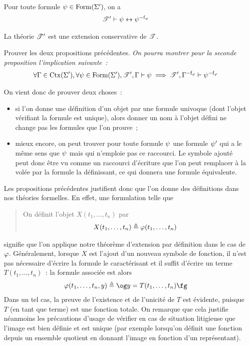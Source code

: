\begin{proposition}
  Pour toute formule $\psi \in \operatorname{Form}(\Sigma')$, on a
  \[\mathscr T' \vdash \psi \mathrel{\leftrightarrow} {\psi}^{-\mathrm{f}_{\varphi}}\]
\end{proposition}

\begin{proposition}\label{prop.ext.def.cons}
  La théorie $\mathscr T'$ est une extension conservative de $\mathscr T$.
\end{proposition}

\begin{exercise}
  Prouver les deux propositions précédentes.
  \textit{On pourra montrer pour la seconde proposition l'implication
    suivante~:}
  \[\forall \Gamma\in\operatorname{Ctx}(\Sigma'), \forall \psi \in \operatorname{Form}(\Sigma'),
  \mathscr T', \Gamma\vdash \psi \implies \mathscr T',{\Gamma}^{-\mathrm{f}_{\varphi}}\vdash {\psi}^{-\mathrm{f}_{\varphi}}\]
\end{exercise}

On vient donc de prouver deux choses~:
\begin{itemize}
\item si l'on donne une définition d'un objet par une formule univoque (dont
  l'objet vérifiant la formule est unique), alors donner un nom à l'objet
  défini ne change pas les formules que l'on prouve~;
\item mieux encore, on peut trouver pour toute formule $\psi$ une formule
  $\psi'$ qui a le même sens que $\psi$ mais qui n'emploie pas ce raccourci.
  Le symbole ajouté peut donc être vu comme un raccourci d'écriture que l'on
  peut remplacer à la volée par la formule la définissant, ce qui donnera une
  formule équivalente.
\end{itemize}

Les propositions précédentes justifient donc que l'on donne des définitions
dans nos théories formelles. En effet, une formulation telle que
\begin{quotation}
  \noindent
  On définit l'objet $X(t_1,\ldots,t_n)$ par
  \[X(t_1,\ldots,t_n) \triangleq \varphi(t_1,\ldots,t_n)\]
\end{quotation}
signifie que l'on applique notre théorème d'extension par définition dans le cas
de $\varphi$. Généralement, lorsque $X$ est l'ajout d'un nouveau symbole de
fonction, il n'est pas nécessaire d'écrire la formule le caractérisant et il
suffit d'écrire un terme $T(t_1,\ldots,t_n)$~: la formule associée est alors
\[\varFF(t_1,\ldots,t_n,y) \defeq \ogM y = T(t_1,\ldots,t_n)\fgM\]
Dans un tel cas, la preuve de l'existence et de l'unicité de $T$ est évidente,
puisque $T$ (en tant que terme) est une fonction totale. On remarque que cela
justifie néanmoins les précautions d'usage de vérifier en cas de situation
litigieuse que l'image est bien définie et est unique (par exemple lorsqu'on
définit une fonction depuis un ensemble quotient en donnant l'image en fonction
d'un représentant).


